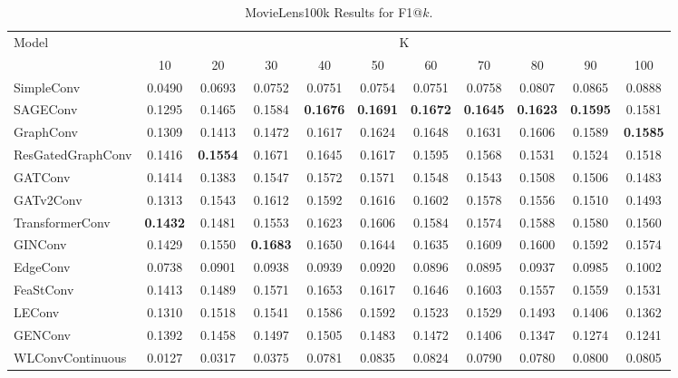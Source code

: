 \documentclass{scrartcl}
\begin{document}
\begin{appendices}
\begin{table}[htbp]
    \hspace{-2.3cm}
    \begin{tabular}{|l|*{10}{c|}}
    \hline
    \multirow{2}{*}{Model} & \multicolumn{10}{c|}{K} \\
    \hhline{~*{10}{|-}|}
                             & 10    & 20    & 30    & 40    & 50    & 60    & 70    & 80    & 90    & 100   \\ \hline
    \rowcolor[gray]{0.9} SimpleConv               & 0.0490 & 0.0693 & 0.0752 & 0.0751 & 0.0754 & 0.0751 & 0.0758 & 0.0807 & 0.0865 & 0.0888 \\ 
    SAGEConv                 & 0.1295 & 0.1465 & 0.1584 & \textbf{0.1676} & \textbf{0.1691} & \textbf{0.1672} & \textbf{0.1645} & \textbf{0.1623} & \textbf{0.1595} & 0.1581 \\ 
    \rowcolor[gray]{0.9} GraphConv                & 0.1309 & 0.1413 & 0.1472 & 0.1617 & 0.1624 & 0.1648 & 0.1631 & 0.1606 & 0.1589 & \textbf{0.1585} \\ 
    ResGatedGraphConv        & 0.1416 & \textbf{0.1554} & 0.1671 & 0.1645 & 0.1617 & 0.1595 & 0.1568 & 0.1531 & 0.1524 & 0.1518 \\ 
    \rowcolor[gray]{0.9} GATConv                  & 0.1414 & 0.1383 & 0.1547 & 0.1572 & 0.1571 & 0.1548 & 0.1543 & 0.1508 & 0.1506 & 0.1483 \\ 
    GATv2Conv                & 0.1313 & 0.1543 & 0.1612 & 0.1592 & 0.1616 & 0.1602 & 0.1578 & 0.1556 & 0.1510 & 0.1493 \\ 
    \rowcolor[gray]{0.9} TransformerConv          & \textbf{0.1432} & 0.1481 & 0.1553 & 0.1623 & 0.1606 & 0.1584 & 0.1574 & 0.1588 & 0.1580 & 0.1560 \\ 
    GINConv                  & 0.1429 & 0.1550 & \textbf{0.1683} & 0.1650 & 0.1644 & 0.1635 & 0.1609 & 0.1600 & 0.1592 & 0.1574 \\ 
    \rowcolor[gray]{0.9} EdgeConv                 & 0.0738 & 0.0901 & 0.0938 & 0.0939 & 0.0920 & 0.0896 & 0.0895 & 0.0937 & 0.0985 & 0.1002 \\ 
    FeaStConv                & 0.1413 & 0.1489 & 0.1571 & 0.1653 & 0.1617 & 0.1646 & 0.1603 & 0.1557 & 0.1559 & 0.1531 \\ 
    \rowcolor[gray]{0.9} LEConv                   & 0.1310 & 0.1518 & 0.1541 & 0.1586 & 0.1592 & 0.1523 & 0.1529 & 0.1493 & 0.1406 & 0.1362 \\ 
    GENConv                  & 0.1392 & 0.1458 & 0.1497 & 0.1505 & 0.1483 & 0.1472 & 0.1406 & 0.1347 & 0.1274 & 0.1241 \\ 
    \rowcolor[gray]{0.9} WLConvContinuous         & 0.0127 & 0.0317 & 0.0375 & 0.0781 & 0.0835 & 0.0824 & 0.0790 & 0.0780 & 0.0800 & 0.0805 \\ \hline
    \end{tabular}
    \caption{MovieLens100k Results for F1@$k$.}
    \label{tab:f1}
\end{table}


\end{appendices}
\end{document}
